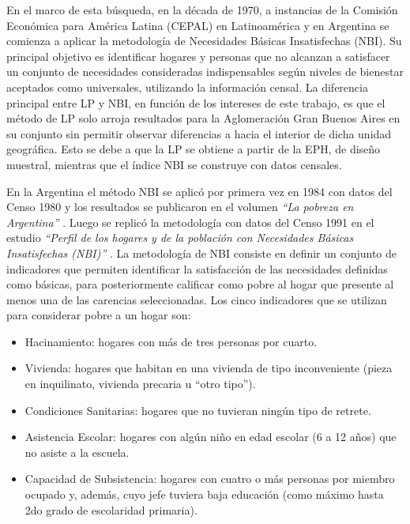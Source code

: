 En el marco de esta búsqueda, en la década de 1970, a instancias de la Comisión Económica para América Latina (CEPAL) en Latinoamérica y en Argentina se comienza a aplicar la metodología de Necesidades Básicas Insatisfechas (NBI). Su principal objetivo es identificar hogares y personas que no alcanzan a satisfacer un conjunto de necesidades consideradas indispensables según niveles de bienestar aceptados como universales, utilizando la información censal. La diferencia principal entre LP y NBI, en función de los intereses de este trabajo, es que el método de LP solo arroja resultados para la Aglomeración Gran Buenos Aires en su conjunto sin permitir observar diferencias a hacia el interior de dicha unidad geográfica. Esto se debe a que la LP se obtiene a partir de la EPH, de diseño muestral, mientras que el índice NBI se construye con datos censales.

En la Argentina el método NBI se aplicó por primera vez en 1984 con datos del Censo 1980 y los resultados se publicaron en el volumen \textit{“La pobreza en Argentina”} \cite{indec1984}. Luego se replicó la metodología con datos del Censo 1991 en el estudio \textit{“Perfil de los hogares y de la población con Necesidades Básicas Insatisfechas (NBI)”} \cite{indec1996}. La metodología de NBI \cite{beccaria,indec2000a,indec2000b} consiste en definir un conjunto de indicadores que permiten identificar la satisfacción de las necesidades definidas como básicas, para posteriormente calificar como pobre al hogar que presente al menos una de las carencias seleccionadas. Los cinco indicadores que se utilizan para considerar pobre a un hogar son:

\begin{itemize}
	\item Hacinamiento: hogares con más de tres personas por cuarto.
	\item Vivienda: hogares que habitan en una vivienda de tipo inconveniente (pieza en inquilinato, vivienda precaria u “otro tipo”).
	\item Condiciones Sanitarias: hogares que no tuvieran ningún tipo de retrete.
	\item Asistencia Escolar: hogares con algún niño en edad escolar (6 a 12 años) que no asiste a la escuela.
	\item Capacidad de Subsistencia: hogares con cuatro o más personas por miembro ocupado y, además, cuyo jefe tuviera baja educación (como máximo hasta 2do grado de escolaridad primaria).
\end{itemize}

